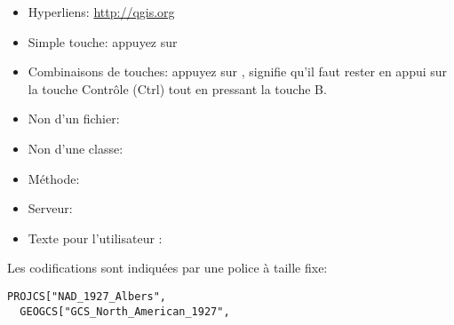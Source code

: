 \begin{itemize}
%
\item Hyperliens: \url{http://qgis.org}
\item Simple touche: appuyez sur 
\item Combinaisons de touches: appuyez sur , signifie qu'il faut rester en appui sur la touche Contr\^ole (Ctrl) tout en pressant la touche B.
\item Non d'un fichier: 
\item Non d'une classe: 
\item M\'ethode: 
\item Serveur: 
%
\item Texte pour l'utilisateur : 
\end{itemize}

Les codifications sont indiqu\'ees par une police \`a taille fixe:
\begin{verbatim}
PROJCS["NAD_1927_Albers",
  GEOGCS["GCS_North_American_1927",
\end{verbatim}

% 

